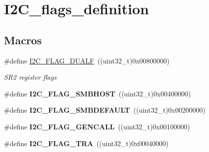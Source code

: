 \hypertarget{group___i2_c__flags__definition}{}\section{I2\+C\+\_\+flags\+\_\+definition}
\label{group___i2_c__flags__definition}
\subsection*{Macros}
\begin{DoxyCompactItemize}
\item 
\mbox{\label{group___i2_c__flags__definition_ga3755b783aa73568659478c2e2e45e27f}} 
\#define \mbox{\hyperlink{group___i2_c__flags__definition_ga3755b783aa73568659478c2e2e45e27f}{I2\+C\+\_\+\+F\+L\+A\+G\+\_\+\+D\+U\+A\+LF}}~((uint32\+\_\+t)0x00800000)
\begin{DoxyCompactList}\small\item\em S\+R2 register flags ~\newline
 \end{DoxyCompactList}\item 
\mbox{\label{group___i2_c__flags__definition_gaf15403a1852f39aaadbb8942ba98d97e}} 
\#define {\bfseries I2\+C\+\_\+\+F\+L\+A\+G\+\_\+\+S\+M\+B\+H\+O\+ST}~((uint32\+\_\+t)0x00400000)
\item 
\mbox{\label{group___i2_c__flags__definition_ga371fb29861d1cd41736253e804c67ad5}} 
\#define {\bfseries I2\+C\+\_\+\+F\+L\+A\+G\+\_\+\+S\+M\+B\+D\+E\+F\+A\+U\+LT}~((uint32\+\_\+t)0x00200000)
\item 
\mbox{\label{group___i2_c__flags__definition_gab3a93b6840ad406c2fc09e0e96c59b88}} 
\#define {\bfseries I2\+C\+\_\+\+F\+L\+A\+G\+\_\+\+G\+E\+N\+C\+A\+LL}~((uint32\+\_\+t)0x00100000)
\item 
\mbox{\label{group___i2_c__flags__definition_ga0359a5f960670d51cb17e659d32498ea}} 
\#define {\bfseries I2\+C\+\_\+\+F\+L\+A\+G\+\_\+\+T\+RA}~((uint32\+\_\+t)0x00040000)
\item 
\mbox{\label{group___i2_c__flags__definition_ga50f69f043d99600221076100823b6ff3}} 

\end{DoxyCompactItemize}
